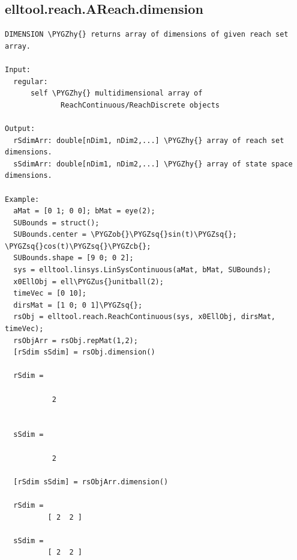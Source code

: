 \documentclass[letterpaper,10pt,english]{sphinxmanual}
\def\PYGZus{\char`\_}
\def\PYGZob{\char`\{}
\def\PYGZcb{\char`\}}
\def\PYGZhy{\char`\-}
\def\PYGZsq{\char`\'}
\begin{document}
\subsection{elltool.reach.AReach.dimension}
\label{chap_functions:elltool-reach-areach-dimension}
\begin{Verbatim}[commandchars=\\\{\}]
DIMENSION \PYGZhy{} returns array of dimensions of given reach set array.

Input:
  regular:
      self \PYGZhy{} multidimensional array of
             ReachContinuous/ReachDiscrete objects

Output:
  rSdimArr: double[nDim1, nDim2,...] \PYGZhy{} array of reach set dimensions.
  sSdimArr: double[nDim1, nDim2,...] \PYGZhy{} array of state space dimensions.

Example:
  aMat = [0 1; 0 0]; bMat = eye(2);
  SUBounds = struct();
  SUBounds.center = \PYGZob{}\PYGZsq{}sin(t)\PYGZsq{}; \PYGZsq{}cos(t)\PYGZsq{}\PYGZcb{};
  SUBounds.shape = [9 0; 0 2];
  sys = elltool.linsys.LinSysContinuous(aMat, bMat, SUBounds);
  x0EllObj = ell\PYGZus{}unitball(2);
  timeVec = [0 10];
  dirsMat = [1 0; 0 1]\PYGZsq{};
  rsObj = elltool.reach.ReachContinuous(sys, x0EllObj, dirsMat, timeVec);
  rsObjArr = rsObj.repMat(1,2);
  [rSdim sSdim] = rsObj.dimension()

  rSdim =

           2


  sSdim =

           2

  [rSdim sSdim] = rsObjArr.dimension()

  rSdim =
          [ 2  2 ]

  sSdim =
          [ 2  2 ]
\end{Verbatim}
\end{document}
